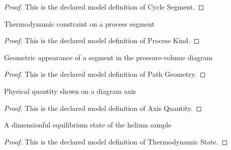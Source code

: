 \begin{proof}
  This is the declared model definition of Cycle Segment.
\end{proof}
\begin{definition}
  \label{def:physics:phyx-mini-0414:phyxminiproblems-problemphyxmini0414-processkind}
  Thermodynamic constraint on a process segment
\end{definition}
\begin{proof}
  This is the declared model definition of Process Kind.
\end{proof}
\begin{definition}
  \label{def:physics:phyx-mini-0414:phyxminiproblems-problemphyxmini0414-pathgeometry}
  Geometric appearance of a segment in the pressure-volume diagram
\end{definition}
\begin{proof}
  This is the declared model definition of Path Geometry.
\end{proof}
\begin{definition}
  \label{def:physics:phyx-mini-0414:phyxminiproblems-problemphyxmini0414-axisquantity}
  Physical quantity shown on a diagram axis
\end{definition}
\begin{proof}
  This is the declared model definition of Axis Quantity.
\end{proof}
\begin{definition}
  \label{def:physics:phyx-mini-0414:phyxminiproblems-problemphyxmini0414-thermodynamicstate}
  A dimensionful equilibrium state of the helium sample
\end{definition}
\begin{proof}
  This is the declared model definition of Thermodynamic State.
\end{proof}
